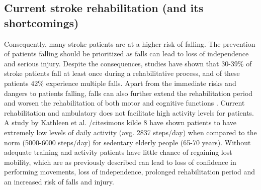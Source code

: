 

\subsection{Current stroke rehabilitation (and its shortcomings)}
Consequently, many stroke patients are at a higher risk of falling. %
The prevention of patients falling should be prioritized as falls can lead to loss of independence and serious injury. Despite the consequences, studies have shown that 30-39\% of stroke patients fall at least once during a rehabilitative process, and of these patients 42\% experience multiple falls. \cite{Bhalla2016, Hanger2014} Apart from the immediate risks and dangers to patients falling, falls can also further extend the rehabilitation period and worsen the rehabilitation of both motor and cognitive functions \cite{Wong2016, Blennerhassett2012}. Current rehabilitation and ambulatory does not facilitate high activity levels for patients. A study by Kathleen et al. /cite{simons kilde 8} have shown patients to have extremely low levels of daily activity (avg. 2837 steps/day) when compared to the norm (5000-6000 steps/day) for sedentary elderly people (65-70 years). Without adequate training and activity patients have little chance of regaining lost mobility, which are as previously described can lead to loss of confidence in performing movements, loss of independence, prolonged rehabilitation period and an increased risk of falls and injury. 





